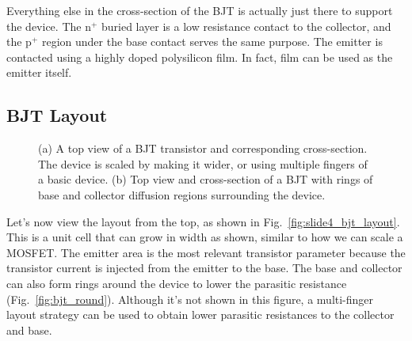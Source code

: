 Everything else in the cross-section of the BJT is actually just there to support the device.  The n$^+$ buried layer is a low resistance contact to the collector, and the p$^+$ region under the base contact serves the same purpose.  The emitter is contacted using a highly doped polysilicon film. In fact, film can be used as the emitter itself.



\subsection{BJT Layout}

\begin{figure}[tb]
\begin{center}
\hspace{1cm}
\end{center}
\caption{(a) A top view of a BJT transistor and corresponding cross-section.  The device is scaled by making it wider, or using multiple fingers of a basic device.  (b) Top view and cross-section of a BJT with rings of base and collector diffusion regions surrounding the device.} 
\end{figure}

Let's now view the layout from the top, as shown in Fig.~\ref{fig:slide4_bjt_layout}.  This is a unit cell that can grow in width as shown, similar to how we can scale a MOSFET.  The emitter area is the most relevant transistor parameter because the transistor current is injected from the emitter to the base.  The base and collector can also form rings around the device to lower the parasitic resistance (Fig.~\ref{fig:bjt_round}).  Although it's not shown in this figure, a multi-finger layout strategy can be used to obtain lower parasitic resistances to the collector and base.  


